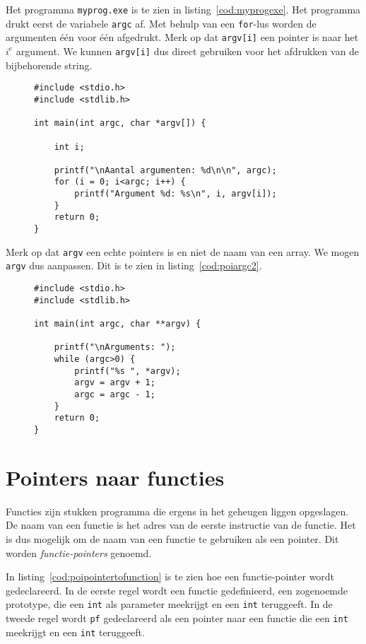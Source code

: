 Het programma \texttt{myprog.exe} is te zien in listing~\ref{cod:myprogexe}. Het
programma drukt eerst de variabele \texttt{argc} af. Met behulp van een \texttt{for}-lus
worden de argumenten \'e\'en voor \'e\'en afgedrukt. Merk op dat \texttt{argv[i]} een
pointer is naar het $i^e$ argument. We kunnen \texttt{argv[i]} dus direct gebruiken
voor het afdrukken van de bijbehorende string.

\begin{figure}[!ht]
\begin{lstlisting}[caption=Het programma myprog.exe.,label=cod:myprogexe]
#include <stdio.h>
#include <stdlib.h>

int main(int argc, char *argv[]) {

    int i;

    printf("\nAantal argumenten: %d\n\n", argc);
    for (i = 0; i<argc; i++) {
        printf("Argument %d: %s\n", i, argv[i]);
    }
    return 0;
}
\end{lstlisting}
\end{figure}

Merk op dat \texttt{argv} een echte pointers is en niet de naam van een array. We mogen \texttt{argv} dus aanpassen. Dit is te zien in listing~\ref{cod:poiargc2}.

\begin{figure}[!ht]
\begin{lstlisting}[caption=Afdrukken van argumenten.,label=cod:poiargc2]
#include <stdio.h>
#include <stdlib.h>

int main(int argc, char **argv) {

    printf("\nArguments: ");
    while (argc>0) {
        printf("%s ", *argv);
        argv = argv + 1;
        argc = argc - 1;
    }
    return 0;
}
\end{lstlisting}
\end{figure}


\section{Pointers naar functies}
\label{sec:pointersnaarfunctie}
Functies zijn stukken programma die ergens in het geheugen liggen opgeslagen. De naam van een functie is het adres van de eerste instructie van de functie. Het is dus mogelijk om de naam van een functie te gebruiken als een pointer. Dit worden \textsl{functie-pointers} genoemd.

In listing~\ref{cod:poipointertofunction} is te zien hoe een functie-pointer wordt gedeclareerd. In de eerste regel wordt een functie gedefinieerd, een zogenoemde prototype, die een \texttt{int} als parameter meekrijgt en een \texttt{int} teruggeeft. In de tweede regel wordt \texttt{pf} gedeclareerd als een pointer naar een functie die een \texttt{int} meekrijgt en een \texttt{int} teruggeeft.

